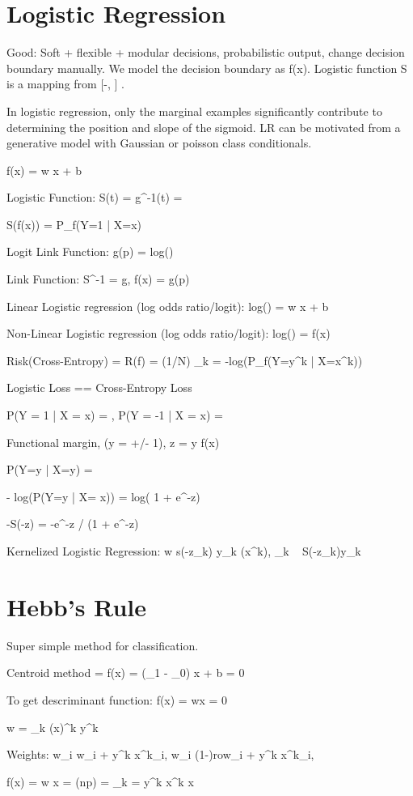 \documentclass[a4paper,twoside,twocolumn]{article}
\begin{document}
\section*{Logistic Regression}
\label{sec-3}
\setlength{\parindent}{0pt}
{\scriptsize
Good: Soft + flexible + modular decisions, probabilistic output, change decision boundary manually.  We model the decision boundary as f(x). Logistic function S is a mapping from [-\inf, \inf] \rightarrow [0, 1].

In logistic regression, only the marginal examples significantly contribute to determining the position and slope of the sigmoid. LR can be motivated from a generative model with Gaussian or poisson class conditionals.

f(x) = w \cdot x + b

Logistic Function: S(t) = g^{-1}(t) = 

S(f(x)) = P_f(Y=1 | X=x)

Logit Link Function: g(p) = log()

Link Function: S^{-1} = g, f(x) = g(p)

Linear Logistic regression (log odds ratio/logit): log() = w \cdot x + b

Non-Linear Logistic regression (log odds ratio/logit): log() = f(x)

Risk(Cross-Entropy) = R(f) = (1/N) \Sigma_k = -log(P_f(Y=y^k | X=x^k))

Logistic Loss == Cross-Entropy Loss

P(Y = 1 | X = x) = , P(Y = -1 | X = x) = 

Functional margin, (y = +/- 1), z = y \cdot f(x)

P(Y=y | X=y) = 

- log(P(Y=y | X= x)) = log( 1 + e^{-z})

-S(-z) = -e^{-z} / (1 + e^{-z})

Kernelized Logistic Regression: \Delta w \approx s(-z_k) y_k \phi(x^k), \Delta \alpha_k ~ S(-z_k)y_k

}

\section*{Hebb's Rule}
\label{sec-4}
\setlength{\parindent}{0pt}
{\scriptsize
Super simple method for classification.

Centroid method = f(x) = (\mu_1 - \mu_0) \cdot x + b = 0

To get descriminant function: f(x) = w\cdot x = 0

w = \sum_k \phi(x)^k y^k

Weights: w_i \leftarrow w_i + y^k x^k_i,  w_i \leftarrow (1-\gamma)row_i + y^k x^k_i, \gamma \in [0, 1]

f(x) = w \cdot x = (np) = \Sigma_k = y^k x^k \cdot x
}
\end{document}
